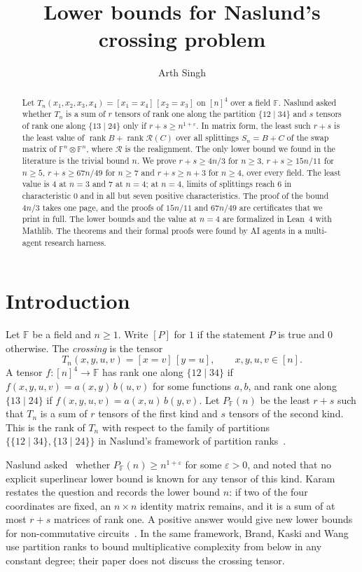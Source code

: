 \documentclass[11pt]{amsart}
\title{Lower bounds for Naslund's crossing problem}
\author{Arth Singh}
\date{}
\theoremstyle{remark}
\newcommand{\F}{\mathbb{F}}
\newcommand{\rk}{\operatorname{rank}}
\newcommand{\R}{\mathcal{R}}
\begin{document}
\begin{abstract}
Let $T_n(x_1,x_2,x_3,x_4)=[x_1=x_4]\,[x_2=x_3]$ on $[n]^4$ over a field $\F$. Naslund asked whether $T_n$
is a sum of $r$ tensors of rank one along the partition $\{12\mid34\}$ and $s$ tensors of rank one along
$\{13\mid24\}$ only if $r+s\ge n^{1+\varepsilon}$. In matrix form, the least such $r+s$ is the least value
of $\rk B+\rk\R(C)$ over all splittings $S_n=B+C$ of the swap matrix of $\F^n\otimes\F^n$, where $\R$ is the
realignment. The only lower bound we found in the literature is the trivial bound $n$. We prove
$r+s\ge 4n/3$ for $n\ge3$, $r+s\ge15n/11$ for $n\ge5$, $r+s\ge67n/49$ for $n\ge7$ and $r+s\ge n+3$ for
$n\ge4$, over every field. The least value is $4$ at $n=3$ and
$7$ at $n=4$; at $n=4$, limits of splittings reach $6$ in characteristic $0$ and in all but seven positive
characteristics. The proof of the bound $4n/3$ takes one page, and the proofs of $15n/11$ and $67n/49$ are
certificates that we print in full. The
lower bounds and the value at $n=4$ are formalized in Lean~4 with Mathlib. The theorems and their formal proofs were found by AI agents
in a multi-agent research harness.
\end{abstract}

\maketitle

\section{Introduction}

Let $\F$ be a field and $n\ge1$. Write $[P]$ for $1$ if the statement $P$ is true and $0$ otherwise. The
\emph{crossing} is the tensor
\[
  T_n(x,y,u,v)=[x=v]\,[y=u],\qquad x,y,u,v\in[n].
\]
A tensor $f\colon[n]^4\to\F$ has rank one along $\{12\mid34\}$ if $f(x,y,u,v)=a(x,y)\,b(u,v)$ for some
functions $a,b$, and rank one along $\{13\mid24\}$ if $f(x,y,u,v)=a(x,u)\,b(y,v)$. Let $P_\F(n)$ be the least
$r+s$ such that $T_n$ is a sum of $r$ tensors of the first kind and $s$ tensors of the second kind. This is
the rank of $T_n$ with respect to the family of partitions $\{\{12\mid34\},\{13\mid24\}\}$ in Naslund's
framework of partition ranks~\cite{Nas20}.

Naslund asked~\cite[Problem~12]{Nas20} whether $P_\F(n)\ge n^{1+\varepsilon}$ for some $\varepsilon>0$, and
noted that no explicit superlinear lower bound is known for any tensor of this kind. Karam~\cite[Question~1.2]
{Kar23} restates the question and records the lower bound $n$: if two of the four coordinates are fixed, an
$n\times n$ identity matrix remains, and it is a sum of at most $r+s$ matrices of rank one. A positive answer
would give new lower bounds for non-commutative circuits~\cite{HWY11,Nas20}. In the same framework, Brand,
Kaski and Wang~\cite{BKW26} use partition ranks to bound multiplicative complexity from below in any constant
degree; their paper does not discuss the crossing tensor.
\end{document}
